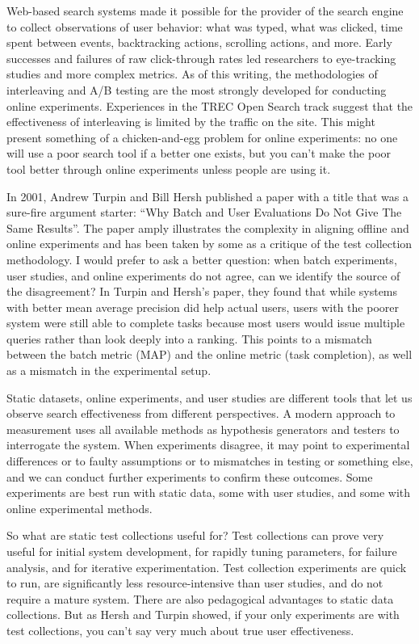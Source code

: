 \documentclass[nobib]{tufte-book}
\begin{document}
Web-based search systems made it possible for the provider of the search engine to collect observations of user behavior: what was typed, what was clicked, time spent between events, backtracking actions, scrolling actions, and more.  Early successes and failures of raw click-through rates led researchers to eye-tracking studies and more complex metrics.  As of this writing, the methodologies of interleaving and A/B testing are the most strongly developed for conducting online experiments.  Experiences in the TREC Open Search track suggest that the effectiveness of interleaving is limited by the traffic on the site.  This might present something of a chicken-and-egg problem for online experiments: no one will use a poor search tool if a better one exists, but you can't make the poor tool better through online experiments unless people are using it.

In 2001, Andrew Turpin and Bill Hersh published a paper with a title that was a sure-fire argument starter: ``Why Batch and User Evaluations Do Not Give The Same Results''.\autocite{turpin_why_2001}   The paper amply illustrates the complexity in aligning offline and online experiments and has been taken by some as a critique of the test collection methodology.  I would prefer to ask a better question: when batch experiments, user studies, and online experiments do not agree, can we identify the source of the disagreement?  In Turpin and Hersh's paper, they found that while systems with better mean average precision did help actual users, users with the poorer system were still able to complete tasks because most users would issue multiple queries rather than look deeply into a ranking.  This points to a mismatch between the batch metric (MAP) and the online metric (task completion), as well as a mismatch in the experimental setup.  

Static datasets, online experiments, and user studies are different tools that let us observe search effectiveness from different perspectives.  A modern approach to measurement uses all available methods as hypothesis generators and testers to interrogate the system.  When experiments disagree, it may point to experimental differences or to faulty assumptions or to mismatches in testing or something else, and we can conduct further experiments to confirm these outcomes.  Some experiments are best run with static data, some with user studies, and some with online experimental methods.

So what are static test collections useful for?  Test collections can prove very useful for initial system development, for rapidly tuning parameters, for failure analysis, and for iterative experimentation.  Test collection experiments are quick to run, are significantly less resource-intensive than user studies, and do not require a mature system.  There are also pedagogical advantages to static data collections.  But as Hersh and Turpin showed, if your only experiments are with test collections, you can't say very much about true user effectiveness.
\end{document}
